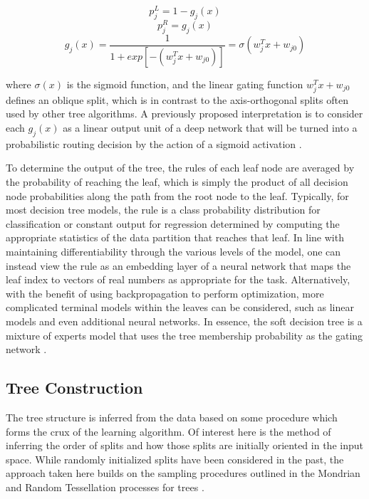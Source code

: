 \documentclass[a4paper,11pt,final]{article}
\begin{document}
\begin{equation}
p^L_j = 1 - g_j(x)
\end{equation}
\begin{equation}
p^R_j = g_j(x)
\end{equation}
\begin{equation}
g_j(x) = \frac{1}{1 + exp[-(w^T_jx + w_{j0})]} = \sigma(w^T_jx + w_{j0})
\end{equation}

where $\sigma(x)$ is the sigmoid function, and the linear gating function $w^T_jx + w_{j0}$ defines an oblique split, which is in contrast to the axis-orthogonal splits often used by other tree algorithms. A previously proposed interpretation is to consider each $g_j(x)$ as a linear output unit of a deep network that will be turned into a probabilistic routing decision by the action of a sigmoid activation \cite{kontschieder2015deep}.

To determine the output of the tree, the rules of each leaf node are averaged by the probability of reaching the leaf, which is simply the product of all decision node probabilities along the path from the root node to the leaf. Typically, for most decision tree models, the rule is a class probability distribution for classification or constant output for regression determined by computing the appropriate statistics of the data partition that reaches that leaf. In line with maintaining differentiability through the various levels of the model, one can instead view the rule as an embedding layer of a neural network that maps the leaf index to vectors of real numbers as appropriate for the task. Alternatively, with the benefit of using backpropagation to perform optimization, more complicated terminal models within the leaves can be considered, such as linear models and even additional neural networks. In essence, the soft decision tree is a mixture of experts model that uses the tree membership probability as the gating network \cite{jordan1994hierarchical}.

\subsection{Tree Construction}

The tree structure is inferred from the data based on some procedure which forms the crux of the learning algorithm. Of interest here is the method of inferring the order of splits and how those splits are initially oriented in the input space. While randomly initialized splits have been considered in the past, the approach taken here builds on the sampling procedures outlined in the Mondrian and Random Tessellation processes for trees \cite{2014arXiv1406.2673L, 2019arXiv190605440G}.
\end{document}
